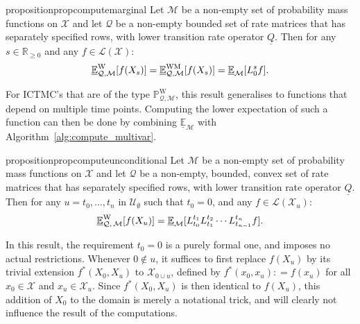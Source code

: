 \documentclass[10pt,a4paper]{paper}
\theoremstyle{definition}
\newcommand{\reals}{\mathbb{R}}
\newcommand{\realsnonneg}{\reals_{\geq 0}}
\newcommand{\states}{\mathcal{X}}
\newcommand{\processes}{\mathbb{P}}
\newcommand{\wprocesses}{\processes^{\mathrm{W}}}
\newcommand{\gambles}{\mathcal{L}}
\newcommand{\gamblesX}{\gambles(\states)}
\newcommand{\rateset}{\mathcal{Q}}
\newcommand{\lrate}{\underline{Q}}
\newcommand{\coloneqq}{:\!=}
\newcommand{\ictmc}{{ICTMC}}
\begin{document}
\begin{restatable}{proposition}{propcomputemarginal}
\label{prop:computemarginal}
Let $\mathcal{M}$ be a non-empty set of probability mass functions on $\states$ and let $\rateset$ be a non-empty bounded set of rate matrices that has separately specified rows, with lower transition rate operator $\lrate$. Then for any $s\in\realsnonneg$ and any $f\in\gamblesX$:
\begin{equation*}
\underline{\mathbb{E}}^\mathrm{W}_{\rateset,\mathcal{M}}[f(X_s)]
=
\underline{\mathbb{E}}^\mathrm{WM}_{\rateset,\mathcal{M}}[f(X_s)]
=
\underline{\mathbb{E}}_{\mathcal{M}}[L_0^s f].\vspace{5pt}
\end{equation*}
\end{restatable}

For {\ictmc}'s that are of the type $\wprocesses_{\rateset,\mathcal{M}}$, this result generalises to functions that depend on multiple time points. Computing the lower expectation of such a function can then be done by combining $\underline{\mathbb{E}}_{\mathcal{M}}$ with Algorithm~\ref{alg:compute_multivar}.

\begin{restatable}{proposition}{propcomputeunconditional}
\label{prop:computeunconditional}
Let $\mathcal{M}$ be a non-empty set of probability mass functions on $\states$ and let $\rateset$ be a non-empty, bounded, convex set of rate matrices that has separately specified rows, with lower transition rate operator $\lrate$. Then for any $u=t_0,\dots,t_n$ in $\mathcal{U}_{\emptyset}$ such that $t_0=0$, and any $f\in\gambles(\states_u)$:
\begin{equation*}
\underline{\mathbb{E}}_{\rateset,\,\mathcal{M}}^\mathrm{W}[f(X_u)]
=
\underline{\mathbb{E}}_{\mathcal{M}}[L_{t_0}^{t_1}L_{t_1}^{t_2}\cdots L_{t_{n-1}}^{t_n}f].\vspace{5pt}
\end{equation*}
\end{restatable}
\noindent
In this result, the requirement $t_0=0$ is a purely formal one, and imposes no actual restrictions. Whenever $0\notin u$, it suffices to first replace $f(X_u)$ by its trivial extension $f^*(X_0,X_u)$ to $\states_{0\cup u}$, defined by $f^*(x_0,x_u)\coloneqq f(x_u)$ for all $x_0\in\states$ and $x_u\in\states_u$. Since $f^*(X_0,X_u)$ is then identical to $f(X_u)$, this addition of $X_0$ to the domain is merely a notational trick, and will clearly not influence the result of the computations. 
\end{document}
